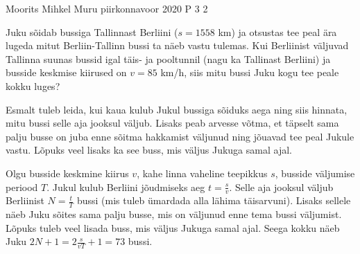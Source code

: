 {Moorits Mihkel Muru} %
{piirkonnavoor} %
{2020} %
{P 3} %
{2} %
{

\ifStatement
Juku sõidab bussiga Tallinnast Berliini ($s = 1558$ km) ja otsustas tee peal ära lugeda mitut Berliin-Tallinn bussi ta näeb vastu tulemas. Kui Berliinist väljuvad Tallinna suunas bussid igal täis- ja pooltunnil (nagu ka Tallinast Berliini) ja busside keskmise kiirused on $v = 85$ km/h, siis mitu bussi Juku kogu tee peale kokku luges?
\fi

\ifHint
Esmalt tuleb leida, kui kaua kulub Jukul bussiga sõiduks aega ning siis hinnata, mitu bussi selle aja jooksul väljub. Lisaks peab arvesse võtma, et täpselt sama palju busse on juba enne sõitma hakkamist väljunud ning jõuavad tee peal Jukule vastu. Lõpuks veel lisaks ka see buss, mis väljus Jukuga samal ajal.
\fi

\ifSolution
Olgu busside keskmine kiirus $v$, kahe linna vaheline teepikkus $s$, busside väljumise periood $T$. Jukul kulub Berliini jõudmiseks aeg $t = \frac{s}{v}$. Selle aja jooksul väljub Berliinist $N = \frac{t}{T}$ bussi (mis tuleb ümardada alla lähima täisarvuni). Lisaks sellele näeb Juku sõites sama palju busse, mis on väljunud enne tema bussi väljumist. Lõpuks tuleb veel lisada buss, mis väljus Jukuga samal ajal. Seega kokku näeb Juku $2N + 1 = 2\frac{s}{vT} +1 = 73$ bussi.
\fi
}
